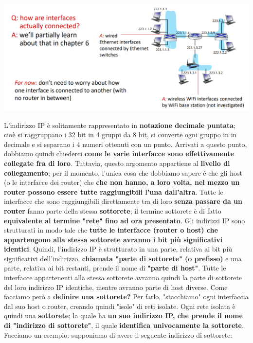 \documentclass[12pt]{article}
\begin{document}
\begin{center}
    \includegraphics[width =1\linewidth]{Images/84.png}
\end{center}
L'indirizzo IP è solitamente rappresentato in \textbf{notazione decimale puntata}; cioè si raggruppano i 32 bit in 4 gruppi da 8 bit, si converte ogni gruppo in
in decimale e si separano i 4 numeri ottenuti con un punto.
Arrivati a questo punto, dobbiamo quindi chiederci \textbf{come le varie interfacce sono effettivamente collegate fra di loro}.
Tuttavia, questo argomento appartiene al \textbf{livello di collegamento}; per il momento, l'unica cosa che dobbiamo sapere è che gli host (o le interfacce dei router) che
\textbf{che non hanno, a loro volta, nel mezzo un router possono essere tutte raggiungibili l'una dall'altra}. Tutte le interfacce che sono raggiungibili direttamente tra di loro \textbf{senza passare da un router}
fanno parte della stessa \textbf{sottorete}; il termine sottorete è di fatto \textbf{equivalente al termine "rete" fino ad ora presentato}.
Gli indirizzi IP sono strutturati in modo tale che \textbf{tutte le interfacce (router o host) che appartengono alla stessa sottorete avranno i bit più significativi identici}.
Quindi, l'indirizzo IP è strutturato in una parte, relativa ai bit più significativi dell'indirizzo, \textbf{chiamata "parte di sottorete" (o prefisso)} e una parte, relativa ai bit restanti, prende il nome di \textbf{"parte di host"}.
Tutte le interfacce appartenenti alla stessa sottorete avranno quindi la parte di sottorete del loro indirizzo IP identiche, mentre avranno parte di host diverse.
Come facciamo però a \textbf{definire una sottorete?}
Per farlo, "stacchiamo" ogni interfaccia dal suo host o router, creando quindi "isole" di reti isolate.
Ogni rete isolata è quindi una \textbf{sottorete}; la quale ha \textbf{un suo indirizzo IP, che prende il nome di "indirizzo di sottorete"}, il quale \textbf{identifica univocamente la sottorete}.
Facciamo un esempio: supponiamo di avere il seguente indirizzo di sottorete:
\end{document}
